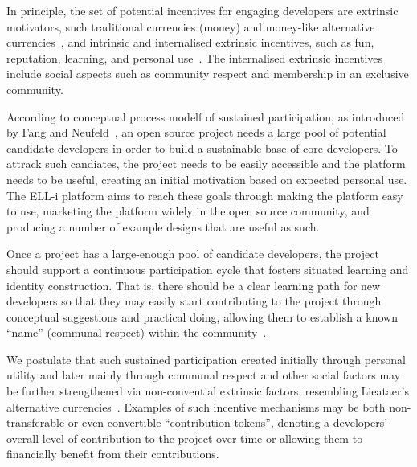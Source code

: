 \documentclass[draft,a4paper]{siamltex}
\begin{document}
In principle, the set of potential incentives for
engaging developers are extrinsic motivators, such traditional
currencies (money) and money-like alternative
currencies~\cite{Liataer2001}, and intrinsic and internalised
extrinsic incentives, such as fun, reputation, learning, and personal
use~\cite{von2012carrots}.  The internalised extrinsic incentives
include social aspects such as community respect and membership in an
exclusive community.

According to conceptual process modelf of sustained participation, as
introduced by Fang and Neufeld~\cite{fang2009understanding}, an open
source project needs a large pool of potential candidate developers in
order to build a sustainable base of core developers.  To attrack such
candiates, the project needs to be easily accessible and the platform
needs to be useful, creating an initial motivation based on expected
personal use.  The ELL-i platform aims to reach these goals through
making the platform easy to use, marketing the platform widely in the
open source community, and producing a number of example designs that
are useful as such.

Once a project has a large-enough pool of candidate developers, the
project should support a continuous participation cycle that fosters
situated learning and identity construction.  That is, there should be
a clear learning path for new developers so that they may easily start
contributing to the project through conceptual suggestions and
practical doing, allowing them to establish a known ``name'' (communal
respect) within the community~\cite{fang2009understanding}.

We postulate that such sustained participation created initially
through personal utility and later mainly through communal respect and other
social factors may be further strengthened via non-convential
extrinsic factors, resembling Lieataer's alternative
currencies~\cite{Lietaer2001}.  Examples of such incentive mechanisms
may be both non-transferable or even convertible ``contribution tokens'',
denoting a developers' overall level of contribution to the project
over time or allowing them to financially benefit from their
contributions.
\end{document}
